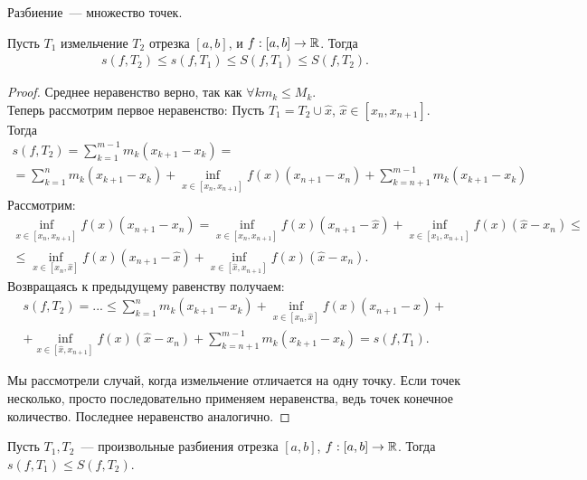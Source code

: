 \documentclass[../main.tex]{subfiles}
\begin{document}
\begin{reminder}
    Разбиение~--- множество точек.
\end{reminder}
    
\begin{proposition}
    Пусть $T_1$ измельчение $T_2$ отрезка $[a,b]$, и $f:[a,b] \to \mathbb{R}$. Тогда \begin{gather*}
        s(f,T_2) \leq s(f, T_1) \leq S(f, T_1) \leq S(f, T_2).
    \end{gather*}
\end{proposition}

\begin{proof}
    Среднее неравенство верно, так как $\forall k m_k \leq M_k$. \\ Теперь рассмотрим первое неравенство:
    Пусть $T_1 = T_2 \cup {\hat x}$, $\hat x \in [x_n, x_{n+1}]$. Тогда 
    \begin{gather*}
        s(f,T_2) = \sum_{k=1}^{m-1} m_k(x_{k+1} - x_k) = \\ = \sum_{k=1}^{n} m_k(x_{k+1} - x_k) + \inf_{x\in[x_n,x_{n+1}]} f(x) (x_{n+1}-x_n)+\sum_{k=n+1}^{m-1} m_k(x_{k+1} - x_k)
    \end{gather*}
    Рассмотрим:
    \begin{gather*}
        \inf_{x\in[x_n,x_{n+1}]} f(x) (x_{n+1}-x_n) =  \inf_{x\in[x_n,x_{n+1}]} f(x) (x_{n+1}-\hat x) +  \inf_{x\in[x_1,x_{n+1}]} f(x) (\hat x-x_n) \leq \\ \leq \inf_{x\in[x_n,\hat x]} f(x) (x_{n+1}-\hat x) +  \inf_{x\in[\hat x,x_{n+1}]} f(x) (\hat x-x_n).
    \end{gather*}
    Возвращаясь к предыдущему равенству получаем:
    \begin{multline*}
        s(f, T_2) = ... \leq \sum_{k=1}^{n} m_k(x_{k+1} - x_k) + \inf_{x\in[x_n,\hat x]} f(x) (x_{n+1}-\hat x) +\\  +\inf_{x\in[\hat x,x_{n+1}]} f(x) (\hat x-x_n)+\sum_{k=n+1}^{m-1} m_k(x_{k+1} - x_k) = s(f, T_1).
    \end{multline*}

    Мы рассмотрели случай, когда измельчение отличается на одну точку. Если точек несколько, просто последовательно применяем неравенства, ведь точек конечное количество. Последнее неравенство аналогично.
\end{proof}

\begin{proposition}
    Пусть $T_1, T_2$~--- произвольные разбиения отрезка $[a,b]$, $f:[a,b] \to \mathbb{R}$. Тогда $s(f, T_1) \leq S(f, T_2)$.
\end{proposition}
\end{document}
